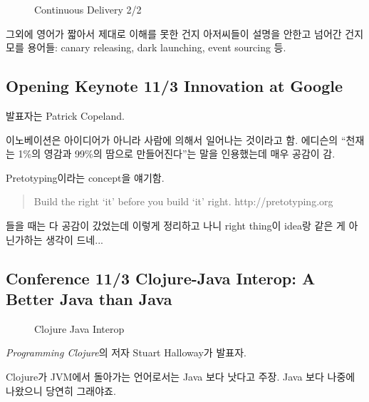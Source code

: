 \documentclass[a4paper]{article}
\begin{document}
\begin{figure}[t]
    \begin{Frame}
        \begin{center}
        \end{center}
    \end{Frame}
    \caption{Continuous Delivery 2/2}
    \label{Continuous Delivery 2}
\end{figure}

그외에 영어가 짧아서 제대로 이해를 못한 건지 아저씨들이 설명을 안한고
넘어간 건지 모를 용어들: canary releasing, dark launching, event
sourcing 등.

\subsection{Opening Keynote 11/3 Innovation at Google}
 
발표자는 Patrick Copeland.
 
이노베이션은 아이디어가 아니라 사람에 의해서 일어나는 것이라고 함.
에디슨의 ``천재는 1\%의 영감과 99\%의 땀으로 만들어진다''는 말을
인용했는데 매우 공감이 감.
 
Pretotyping이라는 concept을 얘기함.
\begin{quote}
Build the right `it' before you build `it' right.
http://pretotyping.org  
\end{quote}
 
들을 때는 다 공감이 갔었는데 이렇게 정리하고 나니 right thing이 idea랑
같은 게 아닌가하는 생각이 드네...

\subsection{Conference 11/3 Clojure-Java Interop: A Better Java than Java}

\begin{figure}[t]
    \begin{Frame}
        \begin{center}
        \end{center}
    \end{Frame}
    \caption{Clojure Java Interop}
    \label{clojure java}
\end{figure}

\textit{Programming Clojure}의 저자 Stuart Halloway가 발표자.
 
Clojure가 JVM에서 돌아가는 언어로서는 Java 보다 낫다고 주장. Java 보다
나중에 나왔으니 당연히 그래야죠.
 
\end{document}
